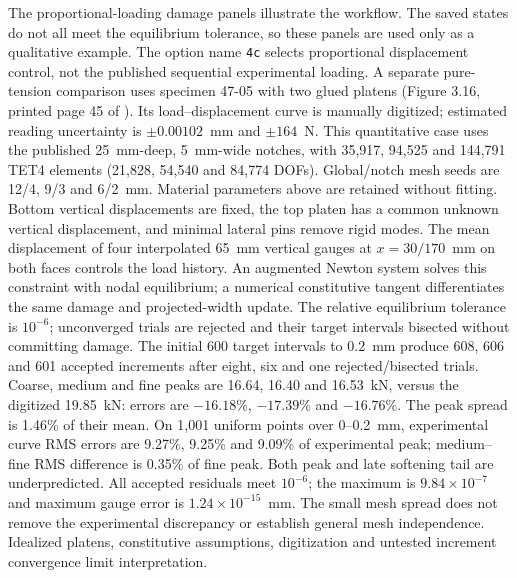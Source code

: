 \documentclass[preprint,11pt,a4paper]{elsarticle}
\begin{document}
The proportional-loading damage panels illustrate the workflow. The saved states do not all meet the equilibrium tolerance, so these
panels are used only as a qualitative example. The option name
\texttt{4c} selects proportional displacement control, not the published
sequential experimental loading. A separate
pure-tension comparison uses specimen 47-05 with two glued platens
(Figure 3.16, printed page 45 of \citep{nooru1992}). Its load--displacement
curve is manually digitized; estimated reading uncertainty is
$\pm 0.00102$~mm and $\pm 164$~N. This quantitative case uses the published
25~mm-deep, 5~mm-wide notches, with 35,917, 94,525 and 144,791 TET4 elements
(21,828, 54,540 and 84,774 DOFs). Global/notch mesh seeds are 12/4, 9/3
and 6/2~mm. Material parameters above are retained
without fitting. Bottom vertical displacements are fixed, the top platen
has a common unknown vertical displacement, and minimal lateral pins
remove rigid modes. The mean displacement of four interpolated 65~mm
vertical gauges at $x=30/170$~mm on both faces controls the load history.
An augmented Newton system solves this constraint with nodal equilibrium;
a numerical constitutive tangent differentiates the same damage and
projected-width update. The relative equilibrium tolerance is $10^{-6}$;
unconverged trials are rejected and their target intervals bisected without
committing damage.
The initial 600 target intervals to 0.2~mm produce 608, 606 and 601 accepted
increments after eight, six and one rejected/bisected trials. Coarse,
medium and fine peaks are 16.64, 16.40 and 16.53~kN, versus the digitized
19.85~kN: errors are $-16.18\%$, $-17.39\%$ and $-16.76\%$.
The peak spread is 1.46\% of their mean. On 1,001 uniform points over
0--0.2~mm, experimental curve RMS errors are 9.27\%, 9.25\% and 9.09\%
of experimental peak; medium--fine RMS difference is 0.35\% of fine peak.
Both peak and late softening tail are underpredicted. All accepted residuals
meet $10^{-6}$; the maximum is $9.84\times10^{-7}$ and maximum gauge error
is $1.24\times10^{-15}$~mm. The small mesh spread does not remove the
experimental discrepancy or establish general mesh independence.
Idealized platens, constitutive assumptions, digitization and untested
increment convergence limit interpretation.

\end{document}
